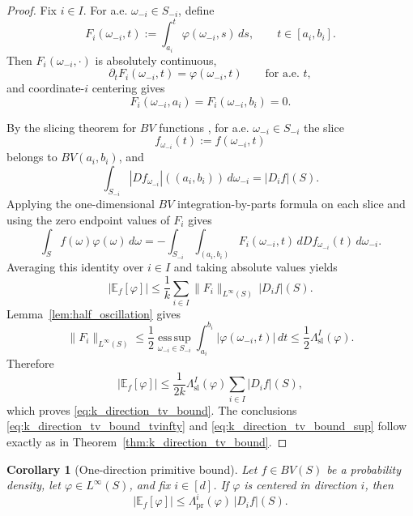 \documentclass[11pt,letterpaper]{article}
\newtheorem{corollary}[theorem]{Corollary}
\theoremstyle{definition}
\theoremstyle{remark}
\begin{document}
\begin{proof}
Fix $i\in I$. For a.e. $\omega_{-i}\in S_{-i}$, define
\[
F_i(\omega_{-i},t)
:=
\int_{a_i}^{t}\varphi(\omega_{-i},s)\,ds,
\qquad
t\in[a_i,b_i].
\]
Then $F_i(\omega_{-i},\cdot)$ is absolutely continuous,
\[
\partial_tF_i(\omega_{-i},t)
=
\varphi(\omega_{-i},t)
\qquad
\text{for a.e. }t,
\]
and coordinate-$i$ centering gives
\[
F_i(\omega_{-i},a_i)
=
F_i(\omega_{-i},b_i)
=
0.
\]

By the slicing theorem for $BV$ functions
\cite{AmbrosioFuscoPallara2000,giovanni_leoni_sobolev}, for a.e.
$\omega_{-i}\in S_{-i}$ the slice
\[
f_{\omega_{-i}}(t):=f(\omega_{-i},t)
\]
belongs to $BV(a_i,b_i)$, and
\[
\int_{S_{-i}}
|Df_{\omega_{-i}}|((a_i,b_i))\,d\omega_{-i}
=
|D_i f|(S).
\]
Applying the one-dimensional $BV$ integration-by-parts formula on each
slice and using the zero endpoint values of $F_i$ gives
\[
\int_S f(\omega)\varphi(\omega)\,d\omega
=
-
\int_{S_{-i}}
\int_{(a_i,b_i)}
F_i(\omega_{-i},t)\,
dDf_{\omega_{-i}}(t)\,
d\omega_{-i}.
\]
Averaging this identity over $i\in I$ and taking absolute values yields
\[
|\mathbb E_f[\varphi]|
\le
\frac1k
\sum_{i\in I}
\|F_i\|_{L^\infty(S)}\,|D_i f|(S).
\]
Lemma~\ref{lem:half_oscillation} gives
\[
\|F_i\|_{L^\infty(S)}
\le
\frac12
\operatorname*{ess\,sup}_{\omega_{-i}\in S_{-i}}
\int_{a_i}^{b_i}
|\varphi(\omega_{-i},t)|\,dt
\le
\frac12\Lambda_{\mathrm{sl}}^I(\varphi).
\]
Therefore
\[
|\mathbb E_f[\varphi]|
\le
\frac{1}{2k}
\Lambda_{\mathrm{sl}}^I(\varphi)
\sum_{i\in I}|D_i f|(S),
\]
which proves \eqref{eq:k_direction_tv_bound}. The conclusions
\eqref{eq:k_direction_tv_bound_tvinfty} and
\eqref{eq:k_direction_tv_bound_sup} follow exactly as in
Theorem~\ref{thm:k_direction_tv_bound}.
\end{proof}

\begin{corollary}[One-direction primitive bound]
\label{cor:one_direction_primitive_bound}
Let $f\in BV(S)$ be a probability density, let
$\varphi\in L^\infty(S)$, and fix $i\in[d]$. If $\varphi$ is centered in
direction $i$, then
\begin{equation}
\label{eq:one_direction_primitive_bound}
|\mathbb E_f[\varphi]|
\le
\Lambda_{\mathrm{pr}}^i(\varphi)\,|D_i f|(S).
\end{equation}
\end{corollary}
\end{document}
